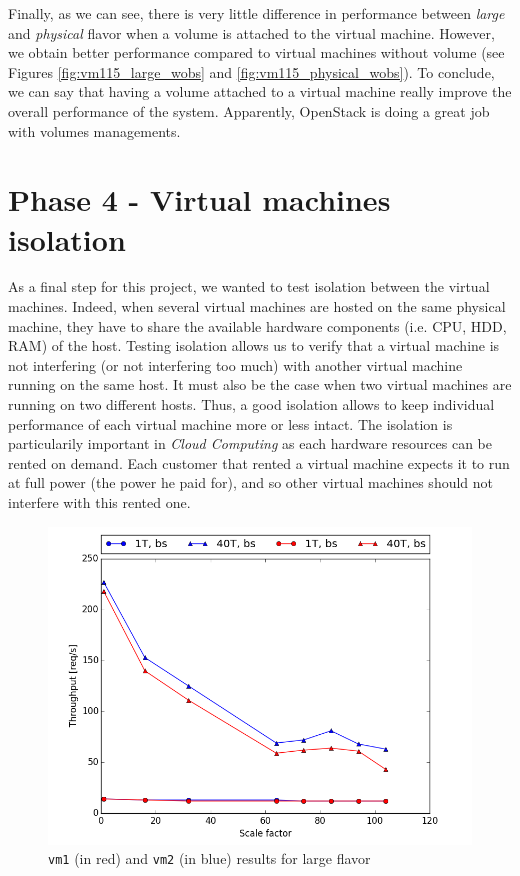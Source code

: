 Finally, as we can see, there is very little difference in performance between \textit{large} and \textit{physical} flavor when a volume is attached to the virtual machine. 
However, we obtain better performance compared to virtual machines without volume (see Figures \ref{fig:vm115_large_wobs} and \ref{fig:vm115_physical_wobs}). 
To conclude, we can say that having a volume attached to a virtual machine really improve the overall performance of the system.
Apparently, OpenStack is doing a great job with volumes managements.




\section{Phase 4 - Virtual machines isolation}

As a final step for this project, we wanted to test isolation between the virtual machines.
Indeed, when several virtual machines are hosted on the same physical machine, they have to share the available hardware components (i.e. CPU, HDD, RAM) of the host.
Testing isolation allows us to verify that a virtual machine is not interfering (or not interfering too much) with another virtual machine running on the same host. 
It must also be the case when two virtual machines are running on two different hosts. 
Thus, a good isolation allows to keep individual performance of each virtual machine more or less intact.
The isolation is particularily important in \textit{Cloud Computing} as each hardware resources can be rented on demand. 
Each customer that rented a virtual machine expects it to run at full power (the power he paid for), and so other virtual machines should not interfere with this rented one.

\begin{figure}[h]
	\centering
	\includegraphics[scale=0.5]{figures/results/vm_large_iso.png}
	\caption{\texttt{vm1} (in red) and \texttt{vm2} (in blue) results for large flavor}
	\label{fig:vm_large_iso}
\end{figure}

